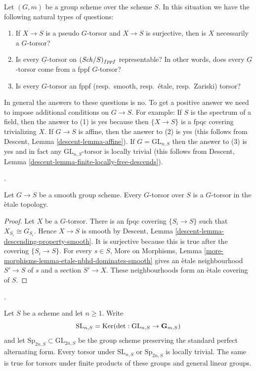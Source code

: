 \begin{remark}
\label{remark-fun-with-torsors}
Let $(G, m)$ be a group scheme over the scheme $S$.
In this situation we have the following natural types of questions:
\begin{enumerate}
\item If $X \to S$ is a pseudo $G$-torsor and $X \to S$ is surjective,
then is $X$ necessarily a $G$-torsor?
\item Is every $\underline{G}$-torsor on $(\mathit{Sch}/S)_{fppf}$
representable? In other words, does every $\underline{G}$-torsor
come from a fppf $G$-torsor?
\item Is every $G$-torsor an
fppf (resp.\ smooth, resp.\ \'etale, resp.\ Zariski) torsor?
\end{enumerate}
In general the answers to these questions is no. To get a positive answer
we need to impose additional conditions on $G \to S$.
For example:
If $S$ is the spectrum of a field, then the answer to (1) is yes
because then $\{X \to S\}$ is a fpqc covering trivializing $X$.
If $G \to S$ is affine, then the answer to (2) is yes
(this follows from Descent, Lemma \ref{descent-lemma-affine}).
If $G = \text{GL}_{n, S}$ then the answer to (3) is yes
and in fact any $\text{GL}_{n, S}$-torsor is locally trivial
(this follows from
Descent, Lemma \ref{descent-lemma-finite-locally-free-descends}).
\end{remark}

\begin{lemma}
\label{lemma-smooth-torsor-etale}
\begin{reference}
\cite[Expos\'e 190, n\textsuperscript{o} 6, p. 326]{FGA}.
\end{reference}
Let $G \to S$ be a smooth group scheme. Every $G$-torsor over $S$
is a $G$-torsor in the \`etale topology.
\end{lemma}

\begin{proof}
Let $X$ be a $G$-torsor. There is an fpqc covering
$\{S_i \to S\}$ such that $X_{S_i} \cong G_{S_i}$. Hence $X \to S$
is smooth by Descent, Lemma
\ref{descent-lemma-descending-property-smooth}. It is surjective because
this is true after the covering $\{S_i \to S\}$. For every $s \in S$,
More on Morphisms, Lemma
\ref{more-morphisms-lemma-etale-nbhd-dominates-smooth}
gives an \`etale neighbourhood $S' \to S$ of $s$ and a section
$S' \to X$. These neighbourhoods form an \`etale covering of $S$.
\end{proof}

\begin{lemma}
\label{lemma-torsors-special-linear-symplectic}
\begin{reference}
\cite[Expos\'e 190, Proposition 6.1 and the discussion following it,
p. 326]{FGA}.
\end{reference}
Let $S$ be a scheme and let $n \geq 1$. Write
$$
\text{SL}_{n, S} = \mathop{\mathrm{Ker}}(\det :
\text{GL}_{n, S} \to \mathbf{G}_{m, S})
$$
and let $\text{Sp}_{2n, S} \subset \text{GL}_{2n, S}$ be the group
scheme preserving the standard perfect alternating form. Every torsor under
$\text{SL}_{n, S}$ or $\text{Sp}_{2n, S}$ is locally trivial. The same is
true for torsors under finite products of these groups and general linear
groups.
\end{lemma}

